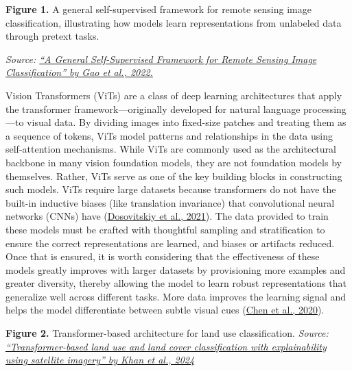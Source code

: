 \documentclass[
  letterpaper,
  DIV=11,
  numbers=noendperiod]{scrreprt}
\begin{document}
\textbf{Figure 1.} A general self-supervised framework for remote
sensing image classification, illustrating how models learn
representations from unlabeled data through pretext tasks.

\emph{Source: \href{https://doi.org/10.3390/rs14194824}{``A General
Self-Supervised Framework for Remote Sensing Image Classification'' by
Gao et al., 2022.}}

Vision Transformers (ViTs) are a class of deep learning architectures
that apply the transformer framework---originally developed for natural
language processing---to visual data. By dividing images into fixed-size
patches and treating them as a sequence of tokens, ViTs model patterns
and relationships in the data using self-attention mechanisms. While
ViTs are commonly used as the architectural backbone in many vision
foundation models, they are not foundation models by themselves. Rather,
ViTs serve as one of the key building blocks in constructing such
models. ViTs require large datasets because transformers do not have the
built-in inductive biases (like translation invariance) that
convolutional neural networks (CNNs) have
(\href{https://doi.org/10.48550/arXiv.2010.11929}{Dosovitskiy et al.,
2021}). The data provided to train these models must be crafted with
thoughtful sampling and stratification to ensure the correct
representations are learned, and biases or artifacts reduced. Once that
is ensured, it is worth considering that the effectiveness of these
models greatly improves with larger datasets by provisioning more
examples and greater diversity, thereby allowing the model to learn
robust representations that generalize well across different tasks. More
data improves the learning signal and helps the model differentiate
between subtle visual cues
(\href{https://doi.org/10.48550/arXiv.2002.05709}{Chen et al., 2020}).

\textbf{Figure 2.} Transformer-based architecture for land use
classification. \emph{Source:
\href{https://doi.org/10.1038/s41598-024-67186-4}{``Transformer-based
land use and land cover classification with explainability using
satellite imagery'' by Khan et al., 2024}}
\end{document}
